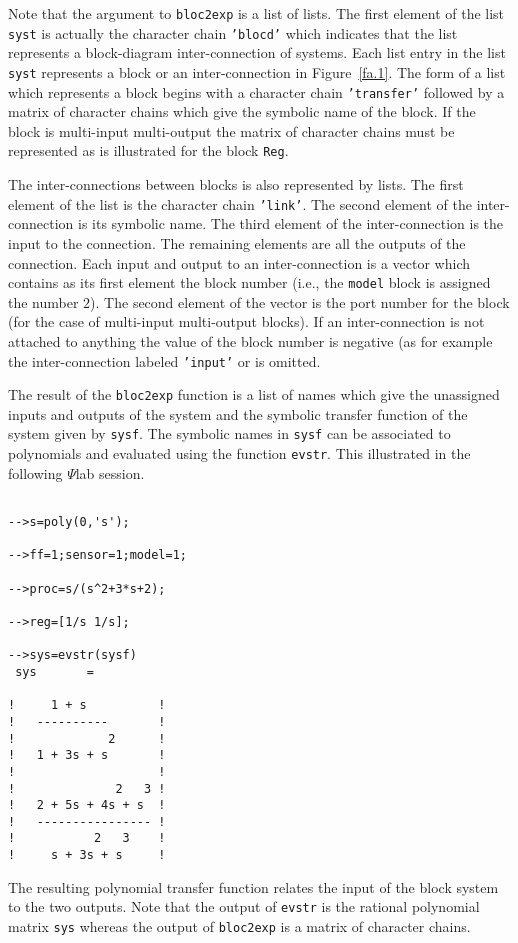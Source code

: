%
Note that the argument to {\tt bloc2exp} is a list of lists.  The 
first element of the list {\tt syst} is actually the character chain
{\tt 'blocd'} which indicates that the list represents a block-diagram
inter-connection of systems.  Each list entry in the list {\tt syst}
represents a block or an inter-connection in Figure~\ref{fa.1}.
The form of a list which represents a block begins with a character
chain {\tt 'transfer'} followed by a matrix of character chains
which give the symbolic name of the block.  If the block is multi-input
multi-output the matrix of character chains must be represented as
is illustrated for the block {\tt Reg}.  

	The inter-connections between blocks is also represented by lists.  
The first element of the list is the character chain {\tt 'link'}.
The second element of the inter-connection is its symbolic name.
The third element of the inter-connection is the input to the connection.
The remaining elements are all the outputs of the connection.
Each input and output to an inter-connection is a vector which
contains as its first element the block number (i.e., the {\tt model}
block is assigned the number $2$).  The second element of the vector
is the port number for the block (for the case of multi-input multi-output
blocks).  If an inter-connection is not attached to anything the value
of the block number is negative (as for example the inter-connection
labeled {\tt 'input'} or is omitted.

	The result of the {\tt bloc2exp} function is a list of names
which give the unassigned inputs and outputs of the system and
the symbolic transfer function of the system given by {\tt sysf}.
The symbolic names in {\tt sysf} can be associated to polynomials
and evaluated using the function {\tt evstr}.  This illustrated in the
following $\Psi$lab session.
%
\begin{verbatim}
 
-->s=poly(0,'s');
 
-->ff=1;sensor=1;model=1;
 
-->proc=s/(s^2+3*s+2);
 
-->reg=[1/s 1/s];
 
-->sys=evstr(sysf)
 sys       =
 
!     1 + s          !
!   ----------       !
!             2      !
!   1 + 3s + s       !
!                    !
!              2   3 !
!   2 + 5s + 4s + s  !
!   ---------------- !
!           2   3    !
!     s + 3s + s     !

\end{verbatim}
%
The resulting polynomial transfer function relates the input
of the block system to the two outputs.  Note that the output
of {\tt evstr} is the rational polynomial matrix {\tt sys}
whereas the output of {\tt bloc2exp} is a matrix of character chains.

